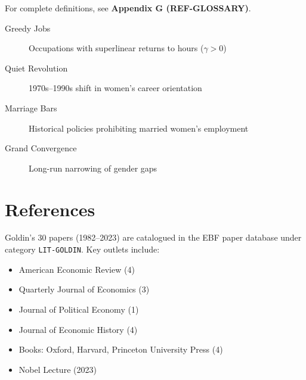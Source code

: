 For complete definitions, see \textbf{Appendix G (REF-GLOSSARY)}.

\begin{description}
    \item[Greedy Jobs] Occupations with superlinear returns to hours ($\gamma > 0$)
    \item[Quiet Revolution] 1970s--1990s shift in women's career orientation
    \item[Marriage Bars] Historical policies prohibiting married women's employment
    \item[Grand Convergence] Long-run narrowing of gender gaps
\end{description}

\section{References}

\nocite{bcm_master}

Goldin's 30 papers (1982--2023) are catalogued in the EBF paper database
under category \texttt{LIT-GOLDIN}. Key outlets include:
\begin{itemize}[nosep]
    \item American Economic Review (4)
    \item Quarterly Journal of Economics (3)
    \item Journal of Political Economy (1)
    \item Journal of Economic History (4)
    \item Books: Oxford, Harvard, Princeton University Press (4)
    \item Nobel Lecture (2023)
\end{itemize}


